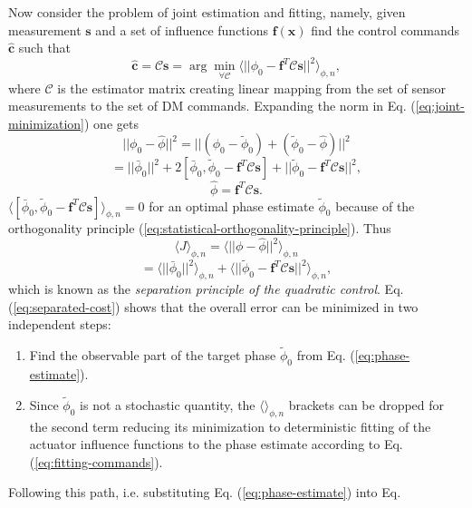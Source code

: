 Now consider the problem of joint estimation and fitting, namely, given
measurement $\bm{s}$ and a set of influence functions $\bm{f}(\bm{x})$ find the
control commands $\hat{\bm{c}}$ such that
\begin{equation} \label{eq:joint-minimization}
	\hat{\bm{c}} = \mathcal{C} \bm{s} =
	\arg \min_{\forall \mathcal{C}}
	\langle
	|| \phi_{0} - \bm{f}^{T} \mathcal{C} \bm{s} ||^{2}
	\rangle_{\phi,n},
\end{equation}
where $\mathcal{C}$ is the estimator matrix creating linear mapping from the
set of sensor measurements to the set of DM commands. Expanding the norm in Eq.
(\ref{eq:joint-minimization}) one gets
\begin{equation} \label{eq:cost-expansion}
  || \phi_{0} - \hat{\phi} ||^{2} =
  || (\phi_{0} - \tilde{\phi}_{0}) + (\tilde{\phi}_{0} - \hat{\phi}) ||^{2}
\end{equation}
$$
 = || \bar{\phi}_{0} ||^{2} +
   2 [\bar{\phi}_{0},
     \tilde{\phi}_{0} - \bm{f}^{T} \mathcal{C} \bm{s} ] +
   || \tilde{\phi}_{0} - \bm{f}^{T} \mathcal{C} \bm{s} ||^{2},
$$
$$
  \hat{\phi} = \bm{f}^{T} \mathcal{C} \bm{s}.
$$
$
\langle
[\bar{\phi}_{0}, \tilde{\phi}_{0} - \bm{f}^{T} \mathcal{C} \bm{s} ]
\rangle_{\phi,n} = 0
$
for an optimal phase estimate $\tilde{\phi}_{0}$ because of the orthogonality
principle (\ref{eq:statistical-orthogonality-principle}). Thus
\begin{equation} \label{eq:separated-cost}
	\langle J \rangle_{\phi,n} =
	\langle || \phi - \hat{\phi} ||^{2} \rangle_{\phi,n}
\end{equation}
$$
  = \langle || \bar{\phi}_{0} ||^{2} \rangle_{\phi,n} +
    \langle
    || \tilde{\phi}_{0} - \bm{f}^{T} \mathcal{C} \bm{s} ||^{2}
    \rangle_{\phi,n},
$$
which is known as the \emph{separation principle of the quadratic control}.
Eq. (\ref{eq:separated-cost}) shows that the overall error can be minimized
in two independent steps:
\begin{enumerate}
	\item Find the observable part of the target phase $\tilde{\phi}_{0}$ from
	Eq. (\ref{eq:phase-estimate}).
  \item Since $\tilde{\phi}_{0}$ is not a stochastic quantity, the $\langle
  \rangle_{\phi,n}$ brackets can be dropped for the second term reducing its
  minimization to deterministic fitting of the actuator influence
  functions to the phase estimate according to Eq. (\ref{eq:fitting-commands}).
\end{enumerate}
Following this path, i.e. substituting Eq. (\ref{eq:phase-estimate}) into Eq.
